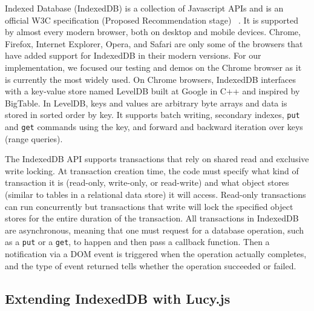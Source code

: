 \documentclass{vldb}
\begin{document}
Indexed Database (IndexedDB) is a collection of Javascript APIs and is an official W3C specification (Proposed Recommendation stage) ~\cite{w3c}. It is supported by almost every modern browser, both on desktop and mobile devices. Chrome, Firefox, Internet Explorer, Opera, and Safari are only some of the browsers that have added support for IndexedDB in their modern versions. For our implementation, we focused our testing and demos on the Chrome browser as it is currently the most widely used.
On Chrome browsers, IndexedDB interfaces with a key-value store named LevelDB built at Google in C++ and inspired by BigTable. In LevelDB, keys and values are arbitrary byte arrays and data is stored in sorted order by key. It supports batch writing, secondary indexes, \texttt{put} and \texttt{get} commands using the key, and forward and backward iteration over keys (range queries). 

The IndexedDB API supports transactions that rely on shared read and exclusive write locking. At transaction creation time, the code must specify what kind of transaction it is (read-only, write-only, or read-write) and what object stores (similar to tables in a relational data store) it will access.  Read-only transactions can run concurrently but transactions that write will lock the specified object stores for the entire duration of the transaction.
All transactions in IndexedDB are asynchronous, meaning that one must request for a database operation, such as a \texttt{put} or a \texttt{get}, to happen and then pass a callback function. Then a notification via a DOM event is triggered when the operation actually completes, and the type of event returned tells whether the operation succeeded or failed.


\subsection{Extending IndexedDB with Lucy.js}
\end{document}
